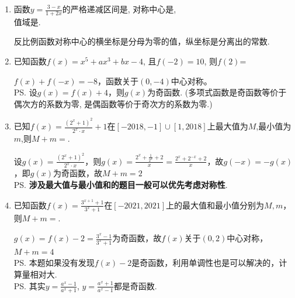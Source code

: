 \begin{enumerate}
\begin{jieda}
\begin{enumerate}
            \item 若$m = 0$，$mx$不在$f(x)$定义域内。
            \item 若$m < 0$，则$f(mx)+mf(x) = mx - \dfrac{1}{mx} + mx - \dfrac{m}{x} = 2mx - \dfrac{1+m^2}{mx}  < 0$，整理得$2mx < \dfrac{1+m^2}{mx} \Rightarrow 2m^2x^2 > 1+m^2 \Rightarrow m^2 > \dfrac{1}{(2x^2-1)}$。因为当$x \in [1, +\infty)$时，$\dfrac{1}{(2x^2-1)} \leq 1$，故$m < -1$
        \end{enumerate}
    \end{jieda}
    \item 函数$y=\frac{3-x}{1+2x}$的严格递减区间是, 对称中心是, \\
    值域是. 
    \begin{jieda}
        反比例函数对称中心的横坐标是分母为零的值，纵坐标是分离出的常数.
    \end{jieda}
    \item 已知函数$f(x)=x^5+ax^3+bx-4$, 且$f(-2)=10$, 则$f(2)$=
    \begin{jieda}
    $f(x)+f(-x)=-8$，函数关于$(0, -4)$中心对称。\\
    \ps 设$g(x) = f(x)+4$，则$g(x)$为奇函数. (多项式函数是奇函数等价于偶次方的系数为零, 是偶函数等价于奇次方的系数为零.)
    \end{jieda}
    \item 已知$f(x) = \frac{(2^x+1)^2}{2^x \cdot x}+1$在$[-2018, -1]\cup[1, 2018]$上最大值为$M$,最小值为$m$,则$M+m = $.
    \begin{jieda}
    设$g(x) = \frac{(2^x+1)^2}{2^x \cdot x}$，则$g(x) = \frac{2^x+\frac{1}{2^x}+2}{x} = \frac{2^x+2^{-x}+2}{x}$，故$g(-x) = -g(x)$，即$g(x)$为奇函数，故$M+m = 2$ \\
    \ps \textbf{涉及最大值与最小值和的题目一般可以优先考虑对称性}.
    \end{jieda}
    \item 已知函数$f(x) = \frac{3^{x+1}+1}{3^x+1}$在$[-2021, 2021]$上的最大值和最小值分别为$M, m$，则$M+m = $.
    \begin{jieda}
        $g(x) = f(x) - 2 = \frac{3^x - 1}{3^x+1}$为奇函数，故$f(x)$关于$(0, 2)$中心对称，$M+m = 4$ \\
        \ps 本题如果没有发现$f(x) - 2$是奇函数，利用单调性也是可以解决的，计算量相对大. \\
        \ps 其实$y=\frac{a^x-1}{a^x+1}$, $y=\frac{a^x+1}{a^x-1}$都是奇函数.
    \end{jieda}

\end{enumerate}
